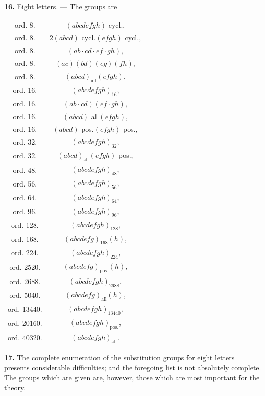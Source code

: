 \documentclass[11pt,a4paper]{article}
\begin{document}
\vspace{0.5em}
\textbf{16.} Eight letters. --- The groups are
\begin{center}
\begin{tabular}{ccl}
ord.  8. & $(abcdefgh)$ cycl., \\
ord.  8. & $2(abcd)$ cycl.$(efgh)$ cycl., \\
ord.  8. & $(ab \cdot cd \cdot ef \cdot gh)$, \\
ord.  8. & $(ac)(bd)(eg)(fh)$, \\
ord.  8. & $(abcd)_{\text{all}}(efgh)$, \\
ord.  16. & $(abcdefgh)_{16}$, \\
ord.  16. & $(ab \cdot cd)(ef \cdot gh)$, \\
ord.  16. & $(abcd)$ all$(efgh)$, \\
ord.  16. & $(abcd)$ pos.$(efgh)$ pos., \\
ord.  32. & $(abcdefgh)_{32}$, \\
ord.  32. & $(abcd)_{\text{all}}(efgh)$ pos., \\
ord.  48. & $(abcdefgh)_{48}$, \\
ord.  56. & $(abcdefgh)_{56}$, \\
ord.  64. & $(abcdefgh)_{64}$, \\
ord.  96. & $(abcdefgh)_{96}$, \\
ord.  128. & $(abcdefgh)_{128}$, \\
ord.  168. & $(abcdefg)_{168}(h)$, \\
ord.  224. & $(abcdefgh)_{224}$, \\
ord.  2520. & $(abcdefg)_{\text{pos.}}(h)$, \\
ord.  2688. & $(abcdefgh)_{2688}$, \\
ord.  5040. & $(abcdefg)_{\text{all}}(h)$, \\
ord.  13440. & $(abcdefgh)_{13440}$, \\
ord.  20160. & $(abcdefgh)_{\text{pos.}}$, \\
ord.  40320. & $(abcdefgh)_{\text{all}}$.
\end{tabular}
\end{center}

\vspace{0.5em}
\textbf{17.} The complete enumeration of the substitution groups for eight letters presents considerable difficulties; and the foregoing list is not absolutely complete. The groups which are given are, however, those which are most important for the theory.
\end{document}
